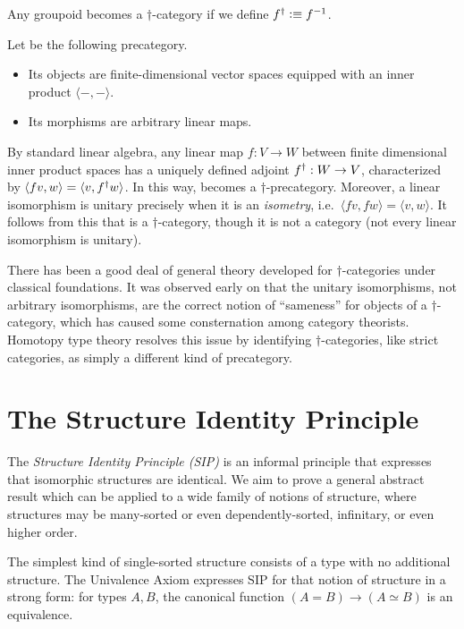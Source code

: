 \begin{eg}
  Any groupoid becomes a $\dagger$-category if we define ${f}^{\dagger} \vcentcolon\equiv {f}^{-1}$.
\end{eg}

\begin{eg}\label{ct:hilb}
  Let \uhilb be the following precategory.
  \begin{itemize}
  \item Its objects are finite-dimensional vector spaces equipped with an inner product $\langle -,-\rangle$.
  \item Its morphisms are arbitrary linear maps.
  \end{itemize}
  By standard linear algebra, any linear map $f:V\to W$ between finite dimensional inner product spaces has a uniquely defined adjoint ${f}^{\dagger}:W\to V$, characterized by $\langle fv,w\rangle = \langle v,{f}^{\dagger} w\rangle$.
  In this way, \uhilb becomes a $\dagger$-precategory.
  Moreover, a linear isomorphism is unitary precisely when it is an \emph{isometry}, i.e.\ $\langle fv,fw\rangle = \langle v,w\rangle$.
  It follows from this that \uhilb is a $\dagger$-category, though it is not a category (not every linear isomorphism is unitary).
\end{eg}

There has been a good deal of general theory developed for $\dagger$-categories under classical foundations.
It was observed early on that the unitary isomorphisms, not arbitrary isomorphisms, are the correct notion of ``sameness'' for objects of a $\dagger$-category, which has caused some consternation among category theorists.
Homotopy type theory resolves this issue by identifying $\dagger$-categories, like strict categories, as simply a different kind of precategory.


\section{The Structure Identity Principle}
\label{sec:sip}

The \emph{Structure Identity Principle (SIP)} is an informal principle
that expresses that isomorphic structures are identical.  We aim to
prove a general abstract result which can be applied to a wide family
of notions of structure, where structures may be many-sorted or even
dependently-sorted, infinitary, or even higher order.

The simplest kind of single-sorted structure consists of a type with
no additional structure.  The Univalence Axiom expresses SIP for that
notion of structure in a strong form: for types $A,B$, the
canonical function $(A=B)\to (A\simeq B)$ is an equivalence.

